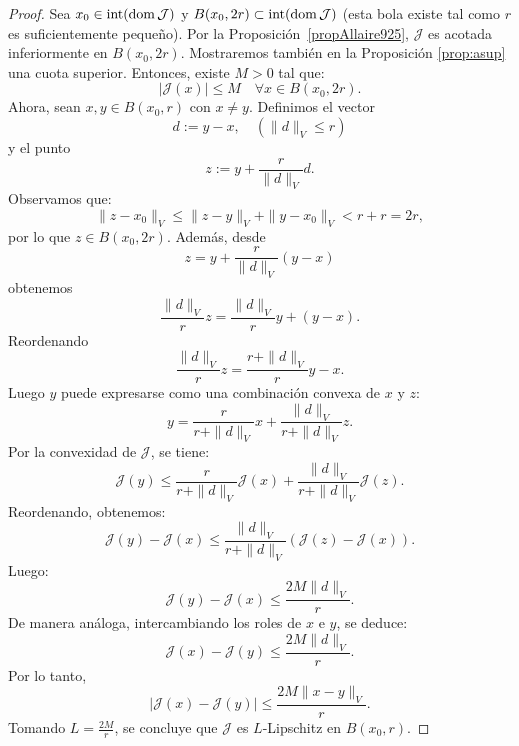 \documentclass[12pt]{book}
\theoremstyle{definition}
\theoremstyle{plain}
\theoremstyle{remark}
\begin{document}
\begin{proof}
    Sea \( x_0 \in \textup{int}(\textup{dom}\,\mathcal{J}) \) y \( B(x_0, 2r) \subset \textup{int}(\textup{dom}\,\mathcal{J}) \) (esta bola existe tal como $r$ es suficientemente pequeño). 
    Por la Proposición~\ref{propAllaire925},
    \( \mathcal{J} \) %
    es acotada inferiormente en
    \( B(x_0, 2r) \). Mostraremos también en la Proposición \ref{prop:asup} una cuota superior.
%    
Entonces, existe \( M > 0 \) tal que:
    \[
    |\mathcal{J}(x)| \leq M \quad \forall x \in B(x_0, 2r).
    \]
    Ahora, sean \( x, y \in B(x_0, r) \) con \( x \neq y \). Definimos el vector \[ d := y - x , \quad (\|d\|_V \leq r)\]
%
    y el punto \[ z := y + \frac{r}{\|d\|_V} d.\] Observamos que:
    \[
    \|z - x_0\|_V \leq \|z - y\|_V + \|y - x_0\|_V < {r} + {r} = 2r,
    \]
    por lo que \( z \in B(x_0, 2r) \). Además,
    desde \[ z = y + \frac{r}{\|d\|_V} (y-x)\]
    obtenemos 
    \[ \frac{\|d\|_V}{r}z = \frac{\|d\|_V}{r}y + (y-x).\]
    Reordenando
        \[ \frac{\|d\|_V}{r}z = \frac{r+\|d\|_V}{r}y  -x.\]
    Luego
    \( y \) puede expresarse como una combinación convexa de \( x \) y \( z \):
    \[
    y = \frac{r}{r+\|d\|_V} x 
    + 
    \frac{\|d\|_V}{r+\|d\|_V} z.
    \]
    Por la convexidad de \( \mathcal{J} \), se tiene:
    \[
    \mathcal{J}(y) \leq 
     \frac{r}{r+\|d\|_V}
    \mathcal{J}(x) +  \frac{\|d\|_V}{r+\|d\|_V} \mathcal{J}(z).
    \]
    Reordenando, obtenemos:
    \[
    \mathcal{J}(y) - \mathcal{J}(x) \leq 
    \frac{\|d\|_V}{r+\|d\|_V}
\left(\mathcal{J}(z) - \mathcal{J}(x)\right). %
    \]
    Luego:
    \[
    \mathcal{J}(y) - \mathcal{J}(x) \leq 
    \frac{2M\|d\|_V}{r}.
    \]    
    De manera análoga, intercambiando los roles de \( x \) e \( y \), se deduce:
    \[
    \mathcal{J}(x) - \mathcal{J}(y) \leq 
    \frac{2M\|d\|_V}{r}.
    \]
    Por lo tanto,
    \[
    |\mathcal{J}(x) - \mathcal{J}(y)| \leq %
    \frac{2M\|x-y\|_V}{r}.
    \]
    Tomando \( L = \frac{2M}{r} \), se concluye que \( \mathcal{J} \) es \( L \)-Lipschitz en \( B(x_0, r )\). 
\end{proof}
\end{document}
